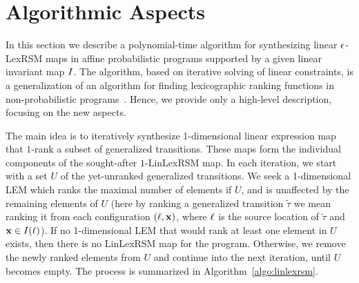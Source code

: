 \section{Algorithmic Aspects}
\label{sec:algo}

In this section we describe a polynomial-time algorithm for synthesizing linear 
$\epsilon$-LexRSM maps in affine probabilistic programs supported by a given linear 
invariant map $I$. The algorithm, based on iterative solving of linear 
constraints, is a generalization of an algorithm for finding 
lexicographic ranking functions in non-probabilistic 
programs~\cite{ADFG10:lexicographic}. Hence, we provide only a high-level 
description, focusing on the new aspects.

The main idea is to iteratively synthesize 1-dimensional linear expression map that $1$-rank a subset of generalized transitions. These maps form the individual components of the sought-after $1$-LinLexRSM map. In each iteration, we start with a set $U$ of the yet-unranked generalized transitions. We seek a 1-dimensional LEM which ranks the maximal number of elements if $U$, and is unaffected by the remaining elements of $U$ (here by ranking a generalized transition $\tilde\tau$ we mean ranking it from each configuration $(\ell,\mathbf{x})$, where $\ell$ is the source location of $\tilde\tau$ and $\mathbf{x}\in I(\ell)$). If no 1-dimensional LEM that would rank at least one element in $U$ exists, then there is no LinLexRSM map for the program. Otherwise, we remove the newly ranked elements from $U$ and continue into the next iteration, until $U$ becomes empty. The process is summarized in Algorithm~\ref{algo:linlexrsm}.

